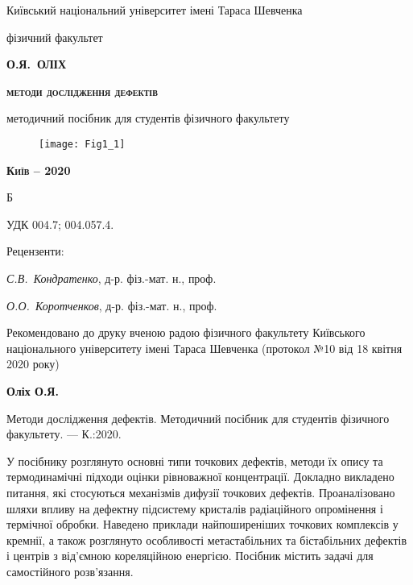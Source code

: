 \begin{titlepage}
\begin{center}

{\small Київський національний університет  імені Тараса Шевченка}

{\small фізичний факультет}


\vspace*{2cm}
{\scshape\bfseries\Large О.Я.~ОЛІХ}

\vspace*{1cm}
{\scshape\bfseries\huge методи дослідження дефектів}

\vspace*{0.5cm}
методичний посібник для студентів фізичного факультету

\end{center}
%
\begin{figure}[h]\center
\texttt{[image: Fig1\_1]}
\end{figure}
%
%
\begin{center}

{\scshape\bfseries Київ -- 2020}
\end{center}
\end{titlepage}
Б

УДК 004.7; 004.057.4.

\begin{center}

 \vspace{0.04\textheight}
 Рецензенти:
\end{center}

\emph{С.В.~Кондратенко}, д-р. фіз.-мат. н., проф.

\emph{О.О.~Коротченков}, д-р. фіз.-мат. н., проф.

\vspace{1cm}
Рекомендовано до друку вченою радою фізичного факультету
Київського національного університету імені Тараса Шевченка
(протокол №10 від 18 квітня 2020 року)



\vspace{1cm}
\textbf{Оліх О.Я.}

Методи дослідження дефектів. Методичний посібник для студентів фізичного факультету. --- К.:2020.

\vspace{1cm}
У посібнику розглянуто основні типи точкових дефектів, методи їх опису та термодинамічні підходи оцінки рівноважної концентрації.
Докладно викладено питання, які стосуються механізмів дифузії точкових дефектів.
Проаналізовано шляхи впливу на дефектну підсистему кристалів радіаційного опромінення і термічної обробки.
Наведено приклади найпоширеніших точкових комплексів у кремнії, а також розглянуто особливості метастабільних та бістабільних дефектів і центрів з від’ємною кореляційною енергією. Посібник містить задачі для самостійного розв’язання. 